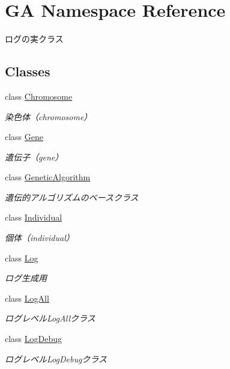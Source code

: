 \hypertarget{namespace_g_a}{}\section{GA Namespace Reference}
\label{namespace_g_a}


ログの実クラス  


\subsection*{Classes}
\begin{DoxyCompactItemize}
\item 
class \mbox{\hyperlink{class_g_a_1_1_chromosome}{Chromosome}}
\begin{DoxyCompactList}\small\item\em 染色体（chromosome） \end{DoxyCompactList}\item 
class \mbox{\hyperlink{class_g_a_1_1_gene}{Gene}}
\begin{DoxyCompactList}\small\item\em 遺伝子（gene） \end{DoxyCompactList}\item 
class \mbox{\hyperlink{class_g_a_1_1_genetic_algorithm}{Genetic\+Algorithm}}
\begin{DoxyCompactList}\small\item\em 遺伝的アルゴリズムのベースクラス \end{DoxyCompactList}\item 
class \mbox{\hyperlink{class_g_a_1_1_individual}{Individual}}
\begin{DoxyCompactList}\small\item\em 個体（individual） \end{DoxyCompactList}\item 
class \mbox{\hyperlink{class_g_a_1_1_log}{Log}}
\begin{DoxyCompactList}\small\item\em ログ生成用 \end{DoxyCompactList}\item 
class \mbox{\hyperlink{class_g_a_1_1_log_all}{Log\+All}}
\begin{DoxyCompactList}\small\item\em ログレベル\+Log\+Allクラス \end{DoxyCompactList}\item 
class \mbox{\hyperlink{class_g_a_1_1_log_debug}{Log\+Debug}}
\begin{DoxyCompactList}\small\item\em ログレベル\+Log\+Debugクラス \end{DoxyCompactList}\item 

\end{DoxyCompactItemize}
